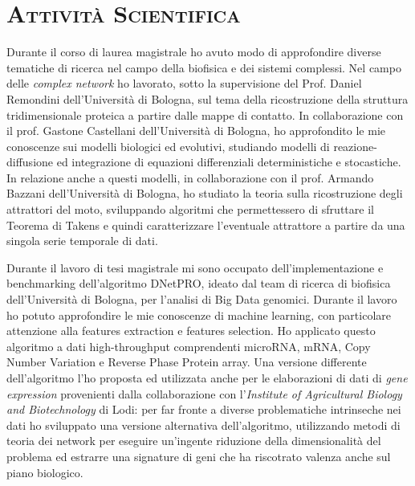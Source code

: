 \documentclass[a4paper,11pt]{article}
\begin{document}
\vspace*{0.5cm}
\section*{\scshape{Attività Scientifica}}

Durante il corso di laurea magistrale ho avuto modo di approfondire diverse tematiche di ricerca nel campo della biofisica e dei sistemi complessi.
Nel campo delle \emph{complex network} ho lavorato, sotto la supervisione del Prof. Daniel Remondini dell'Università di Bologna, sul tema della ricostruzione della struttura tridimensionale proteica a partire dalle mappe di contatto.
In collaborazione con il prof. Gastone Castellani dell'Università di Bologna, ho approfondito le mie conoscenze sui modelli biologici ed evolutivi, studiando modelli di reazione-diffusione ed integrazione di equazioni differenziali deterministiche e stocastiche.
In relazione anche a questi modelli, in collaborazione con il prof. Armando Bazzani dell'Università di Bologna, ho studiato la teoria sulla ricostruzione degli attrattori del moto, sviluppando algoritmi che permettessero di sfruttare il Teorema di Takens e quindi caratterizzare l'eventuale attrattore a partire da una singola serie temporale di dati.

Durante il lavoro di tesi magistrale mi sono occupato dell'implementazione e benchmarking dell'algoritmo DNetPRO, ideato dal team di ricerca di biofisica dell'Università di Bologna, per l'analisi di Big Data genomici.
Durante il lavoro ho potuto approfondire le mie conoscenze di machine learning, con particolare attenzione alla features extraction e features selection.
Ho applicato questo algoritmo a dati high-throughput comprendenti microRNA, mRNA, Copy Number Variation e Reverse Phase Protein array.
Una versione differente dell'algoritmo l'ho proposta ed utilizzata anche per le elaborazioni di dati di \emph{gene expression} provenienti dalla collaborazione con l'\emph{Institute of Agricultural Biology and Biotechnology} di Lodi: per far fronte a diverse problematiche intrinseche nei dati ho sviluppato una versione alternativa dell'algoritmo, utilizzando metodi di teoria dei network per eseguire un'ingente riduzione della dimensionalità del problema ed estrarre una signature di geni che ha riscotrato valenza anche sul piano biologico.
\end{document}
